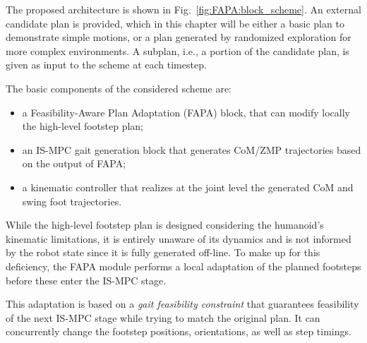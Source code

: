 
The proposed architecture is shown in Fig.~\ref{fig:FAPA:block_scheme}. An external candidate plan is provided, which in this chapter will be either a basic plan to demonstrate simple motions, or a plan generated by randomized exploration \cite{Cipriano2023RAS} for more complex environments. A subplan, i.e., a portion of the candidate plan, is given as input to the scheme at each timestep.

The basic components of the considered scheme are:
\begin{itemize}
\item a Feasibility-Aware Plan Adaptation (FAPA) block, that can modify locally the high-level footstep plan;
\item an IS-MPC gait generation block that generates CoM/ZMP trajectories based on the output of FAPA;
\item a kinematic controller that realizes at the joint level the generated CoM and swing foot trajectories.
\end{itemize}

While the high-level footstep plan is designed considering the humanoid's kinematic limitations, it is entirely unaware of its dynamics and is not informed by the robot state since it is fully generated off-line.
To make up for this deficiency, the FAPA module performs a local adaptation of the planned footsteps before these enter the IS-MPC stage. 

This adaptation is based on a {\em gait feasibility constraint} that guarantees feasibility of the next IS-MPC stage while trying to match the original plan. It can concurrently change the footstep positions, orientations, as well as step timings. 

